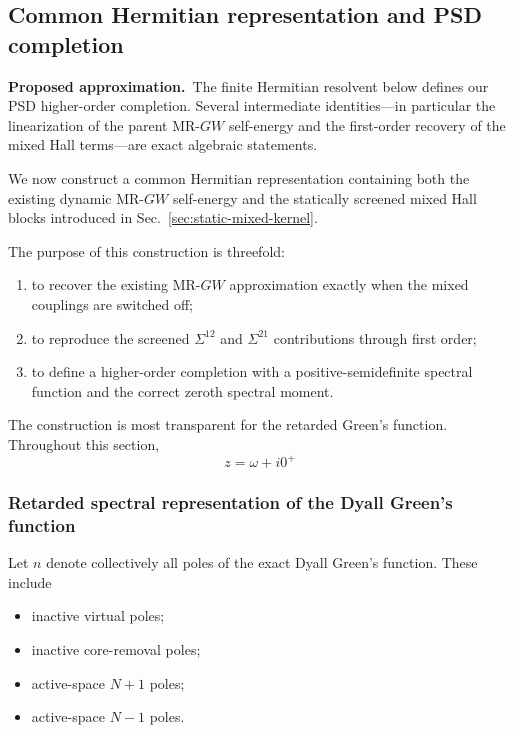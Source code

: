 \documentclass[aip,jcp,reprint,noshowkeys,superscriptaddress]{revtex4-1}
\newcommand{\Proposed}{\textbf{Proposed approximation.}\ }
\begin{document}
\subsection{Common Hermitian representation and PSD completion}
\label{sec:hermitian-completion}

\Proposed The finite Hermitian resolvent below defines our PSD
higher-order completion.  Several intermediate identities---in particular the
linearization of the parent MR-$GW$ self-energy and the first-order recovery of
the mixed Hall terms---are exact algebraic statements.


We now construct a common Hermitian representation containing both the
existing dynamic MR-$GW$ self-energy and the statically screened mixed
Hall blocks introduced in Sec.~\ref{sec:static-mixed-kernel}.

The purpose of this construction is threefold:
\begin{enumerate}
  \item to recover the existing MR-$GW$ approximation exactly when the
  mixed couplings are switched off;
  \item to reproduce the screened $\Sigma^{12}$ and $\Sigma^{21}$
  contributions through first order;
  \item to define a higher-order completion with a positive-semidefinite
  spectral function and the correct zeroth spectral moment.
\end{enumerate}

The construction is most transparent for the retarded Green's function.
Throughout this section,
\begin{equation}
  z
  =
  \omega+i0^+
\end{equation}


\subsubsection{Retarded spectral representation of the Dyall Green's function}

Let $n$ denote collectively all poles of the exact Dyall Green's
function.  These include
\begin{itemize}
  \item inactive virtual poles;
  \item inactive core-removal poles;
  \item active-space $N+1$ poles;
  \item active-space $N-1$ poles.
\end{itemize}
\end{document}

